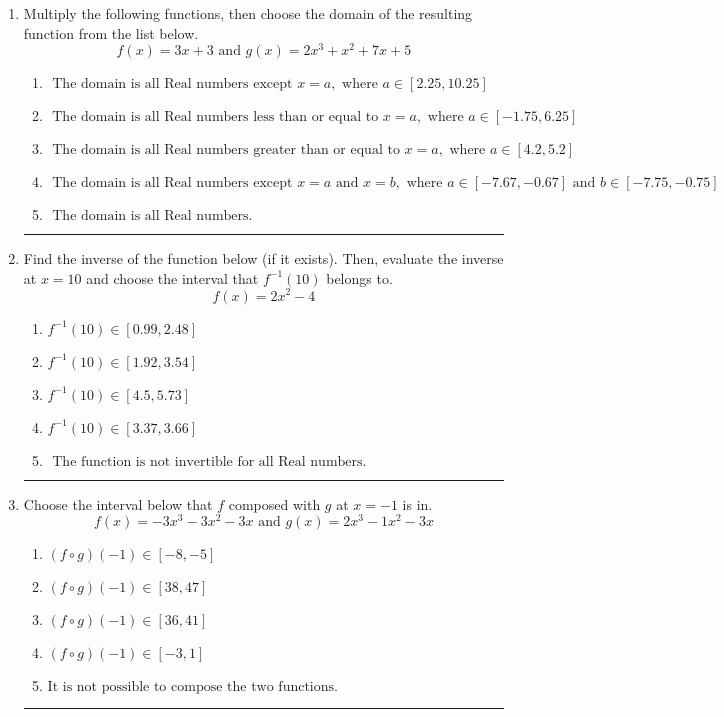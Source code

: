 \documentclass[14pt]{extbook}
\newcommand{\litem}[1]{\item#1\hspace*{-1cm}\rule{\textwidth}{0.4pt}}
\begin{document}
\begin{enumerate}
{\begin{enumerate}[label=\Alph*.]
\end{enumerate} }
\litem{
Multiply the following functions, then choose the domain of the resulting function from the list below.\[ f(x) = 3x + 3 \text{ and } g(x) = 2x^{3} + x^{2} +7 x + 5 \]\begin{enumerate}[label=\Alph*.]
\item \( \text{ The domain is all Real numbers except } x = a, \text{ where } a \in [2.25, 10.25] \)
\item \( \text{ The domain is all Real numbers less than or equal to } x = a, \text{ where } a \in [-1.75, 6.25] \)
\item \( \text{ The domain is all Real numbers greater than or equal to } x = a, \text{ where } a \in [4.2, 5.2] \)
\item \( \text{ The domain is all Real numbers except } x = a \text{ and } x = b, \text{ where } a \in [-7.67, -0.67] \text{ and } b \in [-7.75, -0.75] \)
\item \( \text{ The domain is all Real numbers. } \)

\end{enumerate} }
\litem{
Find the inverse of the function below (if it exists). Then, evaluate the inverse at $x = 10$ and choose the interval that $f^{-1}(10)$ belongs to.\[ f(x) = 2 x^2 - 4 \]\begin{enumerate}[label=\Alph*.]
\item \( f^{-1}(10) \in [0.99, 2.48] \)
\item \( f^{-1}(10) \in [1.92, 3.54] \)
\item \( f^{-1}(10) \in [4.5, 5.73] \)
\item \( f^{-1}(10) \in [3.37, 3.66] \)
\item \( \text{ The function is not invertible for all Real numbers. } \)

\end{enumerate} }
\litem{
Choose the interval below that $f$ composed with $g$ at $x=-1$ is in.\[ f(x) = -3x^{3} -3 x^{2} -3 x \text{ and } g(x) = 2x^{3} -1 x^{2} -3 x \]\begin{enumerate}[label=\Alph*.]
\item \( (f \circ g)(-1) \in [-8, -5] \)
\item \( (f \circ g)(-1) \in [38, 47] \)
\item \( (f \circ g)(-1) \in [36, 41] \)
\item \( (f \circ g)(-1) \in [-3, 1] \)
\item \( \text{It is not possible to compose the two functions.} \)


\end{enumerate}}
\end{enumerate}
\end{document}
